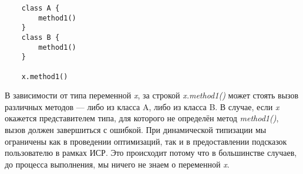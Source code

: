 \vskip4pt

\begin{verbatim}
    class A {
        method1()
    }
    class B {
        method1()
    }

    x.method1()
\end{verbatim} 

\vskip4pt


В зависимости от типа переменной \textit{x}, за строкой \textit{x.method1()} может стоять вызов различных методов --- либо из класса A, либо из класса B. В случае, если \textit{x} окажется представителем типа, для которого не определён метод \textit{method1()}, вызов должен завершиться с ошибкой. При динамической типизации мы ограничены как в проведении оптимизаций, так и в предоставлении подсказок пользователю в рамках ИСР. Это происходит потому что в большинстве случаев, до процесса выполнения, мы ничего не знаем о переменной \textit{x}.


